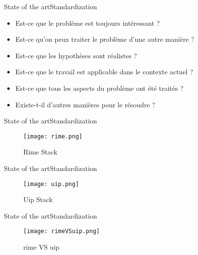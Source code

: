 \begin{frame}{State of the art}{Standardization}
{\begin{itemize}
			\begin{itemize}
				\item Est-ce que le problème est toujours intéressant ?
				\item Est-ce qu'on peux traiter le problème d'une autre manière ?
				\item Est-ce que les hypothèses sont réalistes ?
				\item Est-ce que le travail est applicable dans le contexte actuel ?
				\item Est-ce que tous les aspects du problème ont été traités ?
				\item Existe-t-il d’autres manières pour le résoudre ?
			\end{itemize}
		\end{itemize}
	}
\end{frame}

\begin{frame}{State of the art}{Standardization}
	\begin{figure}
		\texttt{[image: rime.png]}
		\caption{\label{fig:rime} Rime Stack}
	\end{figure}
\end{frame}

\begin{frame}{State of the art}{Standardization}
	\begin{figure}
		\texttt{[image: uip.png]}
		\caption{\label{fig:uip} Uip Stack}
	\end{figure}
\end{frame}

\begin{frame}{State of the art}{Standardization}
	\begin{figure}
		\texttt{[image: rimeVSuip.png]}
		\caption{\label{fig:rimeVSuip} rime VS uip}
	\end{figure}
\end{frame}

